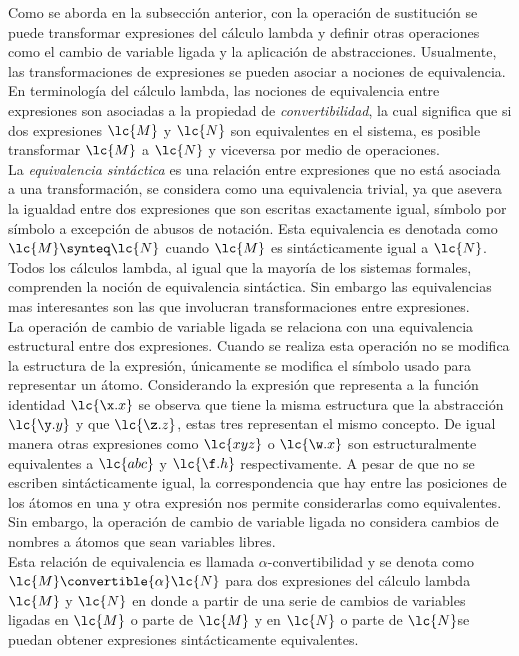 Como se aborda en la subsección anterior, con la operación de sustitución se
puede transformar expresiones del cálculo lambda y definir otras operaciones
como el cambio de variable ligada y la aplicación de abstracciones. Usualmente,
las transformaciones de expresiones se pueden asociar a nociones de
equivalencia. En terminología del cálculo lambda, las nociones de equivalencia
entre expresiones son asociadas a la propiedad de \emph{convertibilidad}, la
cual significa que si dos expresiones \(\lc{M}\) y \(\lc{N}\) son equivalentes en
el sistema, es posible transformar \(\lc{M}\) a \(\lc{N}\) y viceversa por medio
de operaciones. \\

La \emph{equivalencia sintáctica} es una relación entre expresiones que no está
asociada a una transformación, se considera como una equivalencia trivial, ya
que asevera la igualdad entre dos expresiones que son escritas exactamente
igual, símbolo por símbolo a excepción de abusos de notación. Esta equivalencia
es denotada como \(\lc{M} \synteq \lc{N}\) cuando \(\lc{M}\) es sintácticamente
igual a \(\lc{N}\). \\

Todos los cálculos lambda, al igual que la mayoría de los sistemas formales,
comprenden la noción de equivalencia sintáctica. Sin embargo las equivalencias
mas interesantes son las que involucran transformaciones entre expresiones. \\

La operación de cambio de variable ligada se relaciona con una equivalencia
estructural entre dos expresiones. Cuando se realiza esta operación no se
modifica la estructura de la expresión, únicamente se modifica el símbolo usado
para representar un átomo. Considerando la expresión que representa a la función
identidad \(\lc{\x.x}\) se observa que tiene la misma estructura que la
abstracción \(\lc{\y.y}\) y que \(\lc{\z.z}\), estas tres representan el mismo
concepto. De igual manera otras expresiones como \(\lc{x y z}\) o \(\lc{\w.x}\)
son estructuralmente equivalentes a \(\lc{a b c}\) y \(\lc{\f.h}\)
respectivamente. A pesar de que no se escriben sintácticamente igual, la
correspondencia que hay entre las posiciones de los átomos en una y otra
expresión nos permite considerarlas como equivalentes. Sin embargo, la operación
de cambio de variable ligada no considera cambios de nombres a átomos que sean
variables libres. \\

Esta relación de equivalencia es llamada \(\alpha\)-convertibilidad y se denota
como \(\lc{M} \convertible{\alpha} \lc{N}\) para dos expresiones del cálculo
lambda \(\lc{M}\) y \(\lc{N}\) en donde a partir de una serie de cambios de
variables ligadas en \(\lc{M}\) o parte de \(\lc{M}\) y en \(\lc{N}\) o parte de
\(\lc{N}\)se puedan obtener expresiones sintácticamente equivalentes. \\

